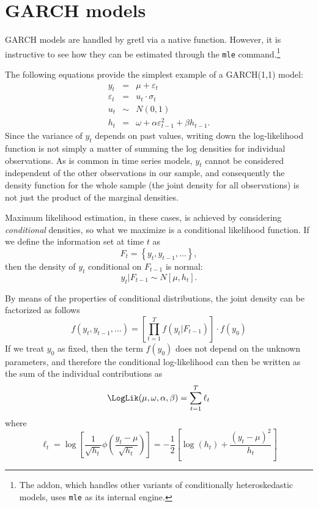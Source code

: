 \section{GARCH models}
\label{sec:garch}

GARCH models are handled by gretl via a native function. However, it is
instructive to see how they can be estimated through the \texttt{mle}
command.\footnote{The  addon, which handles other variants
of conditionally heteroskedastic models, uses \texttt{mle} as its
internal engine.}

The following equations provide the simplest example of a GARCH(1,1)
model:
\begin{eqnarray*}
  y_t & = & \mu + \varepsilon_t \\
  \varepsilon_t & = & u_t \cdot \sigma_t \\
  u_t & \sim & N(0,1) \\
  h_t & = & \omega + \alpha \varepsilon^2_{t-1} + \beta h_{t-1}.
\end{eqnarray*}
Since the variance of $y_t$ depends on past values, writing down the
log-likelihood function is not simply a matter of summing the log
densities for individual observations. As is common in time series
models, $y_t$ cannot be considered independent of the other
observations in our sample, and consequently the density function for
the whole sample (the joint density for all observations) is not just
the product of the marginal densities.

Maximum likelihood estimation, in these cases, is achieved by
considering \emph{conditional} densities, so what we maximize is a
conditional likelihood function. If we define the information set at
time $t$ as
\[
  F_t = \left\{ y_t, y_{t-1}, \ldots \right\} ,
\]
then the density of $y_t$ conditional on $F_{t-1}$ is normal:
\[
  y_t | F_{t-1} \sim N\left[ \mu, h_{t} \right].
\]

By means of the properties of conditional distributions, the joint
density can be factorized as follows
\[
  f(y_t, y_{t-1}, \ldots) = \left[ \prod_{t=1}^T f(y_t |F_{t-1})
  \right] \cdot f(y_0)
\]
If we treat $y_0$ as fixed, then the term $f(y_0)$ does not depend on
the unknown parameters, and therefore the conditional log-likelihood
can then be written as the sum of the individual contributions as
\begin{equation}
  \label{eq:garchloglik}
  \LogLik(\mu,\omega,\alpha,\beta) = \sum_{t=1}^T \ell_t
\end{equation}
where 
\[
  \ell_t = \log \left[ \frac{1}{\sqrt{h_t}} \phi\left( \frac{y_t - \mu}{\sqrt{h_t}}
    \right) \right] = 
    - \frac{1}{2} \left[ \log(h_t) + \frac{(y_t - \mu)^2}{h_t} \right]
\]

